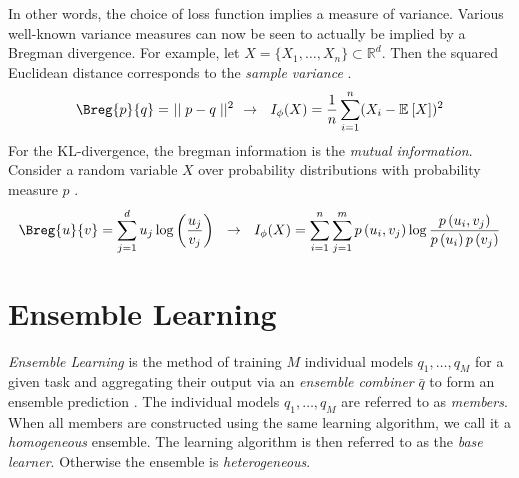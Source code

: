 \documentclass[
    a4paper, %
	fontsize=10pt, %
	twoside=false, %
]{kaobook}
\begin{document}
In other words, the choice of loss function implies a measure of variance. Various well-known variance measures can now be seen to actually be implied by a Bregman divergence.
For example, let $X = \{ X_{1}, \dots, X_{n} \} \subset \mathbb{R}^d$. Then the squared Euclidean distance corresponds to the \textit{sample variance} \cite{banerjee_ClusteringBregmanDivergences_2004}.
$$
\Breg{p}{q} =~\mid\mid p-q\mid\mid^2 ~ ~ \rightarrow ~ ~ 
I_{\phi}(X) = \frac{1}{n} \sum_{i=1}^n (X_{i} - \mathbb{E}_{}\left[ X \right] )^2
$$
For the KL-divergence, the bregman information is the \textit{mutual information}. Consider a random variable $X$ over probability distributions with probability measure $p$ \cite{banerjee_ClusteringBregmanDivergences_2004}.
$$
\Breg{u}{v} = \sum_{j=1}^d u_{j} \log \left( \frac{u_{j}}{v_{j}} \right) 
~ ~ \rightarrow ~ ~  I_{\phi}(X) = 
\sum_{i=1}^n \sum_{j=1}^m p\left(u_i, v_j\right) \log \frac{p\left(u_i, v_j\right)}{p\left(u_i\right) p\left(v_j\right)}
$$






\chapter{Ensemble Learning}
\label{chapter:ensemble-learning}

\textit{Ensemble Learning} is the method of training $M$ individual models $q_{1}, \dots, q_{M}$ for a given task and aggregating their output via an \textit{ensemble combiner} $\bar{q}$ to form an ensemble prediction \cite{zhou_EnsembleMethodsFoundations_2012}.
The individual models $q_{1}, \dots, q_{M}$ are referred to as \textit{members}. When all members are constructed using the same learning algorithm, we call it a \textit{homogeneous} ensemble. The learning algorithm is then referred to as the \textit{base learner}. Otherwise the ensemble is \textit{heterogeneous}. 
\end{document}
